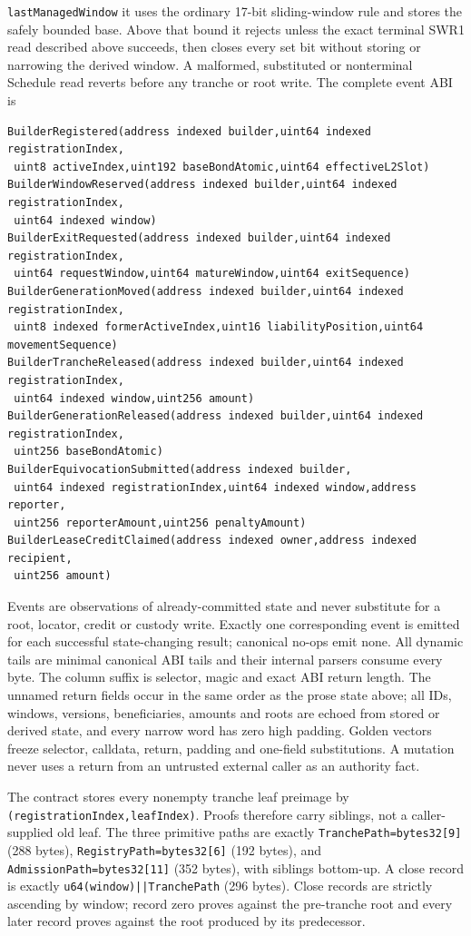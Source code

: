 \documentclass[a4paper,11pt]{article}
\newcommand{\code}[1]{\nolinkurl{#1}}
\begin{document}
\code{lastManagedWindow} it uses the ordinary 17-bit sliding-window rule and
stores the safely bounded base.  Above that bound it rejects unless the exact
terminal SWR1 read described above succeeds, then closes every set bit without
storing or narrowing the derived window.  A malformed, substituted or
nonterminal Schedule read reverts before any tranche or root write.
The complete event ABI is
\begin{verbatim}
BuilderRegistered(address indexed builder,uint64 indexed registrationIndex,
 uint8 activeIndex,uint192 baseBondAtomic,uint64 effectiveL2Slot)
BuilderWindowReserved(address indexed builder,uint64 indexed registrationIndex,
 uint64 indexed window)
BuilderExitRequested(address indexed builder,uint64 indexed registrationIndex,
 uint64 requestWindow,uint64 matureWindow,uint64 exitSequence)
BuilderGenerationMoved(address indexed builder,uint64 indexed registrationIndex,
 uint8 indexed formerActiveIndex,uint16 liabilityPosition,uint64 movementSequence)
BuilderTrancheReleased(address indexed builder,uint64 indexed registrationIndex,
 uint64 indexed window,uint256 amount)
BuilderGenerationReleased(address indexed builder,uint64 indexed registrationIndex,
 uint256 baseBondAtomic)
BuilderEquivocationSubmitted(address indexed builder,
 uint64 indexed registrationIndex,uint64 indexed window,address reporter,
 uint256 reporterAmount,uint256 penaltyAmount)
BuilderLeaseCreditClaimed(address indexed owner,address indexed recipient,
 uint256 amount)
\end{verbatim}
Events are observations of already-committed state and never substitute for a
root, locator, credit or custody write.  Exactly one corresponding event is
emitted for each successful state-changing result; canonical no-ops emit none.
All dynamic tails are minimal canonical ABI tails and their internal parsers
consume every byte.  The column suffix is selector, magic and exact ABI return
length.  The unnamed return fields occur in the same order as the prose state
above; all IDs, windows, versions, beneficiaries, amounts and roots are echoed
from stored or derived state, and every narrow word has zero high padding.
Golden vectors freeze selector, calldata, return, padding and one-field
substitutions.  A mutation never uses a return from an untrusted external
caller as an authority fact.

The contract stores every nonempty tranche leaf preimage by
\code{(registrationIndex,leafIndex)}.  Proofs therefore carry siblings, not a
caller-supplied old leaf.  The three primitive paths are exactly
\code{TranchePath=bytes32[9]} (288 bytes),
\code{RegistryPath=bytes32[6]} (192 bytes), and
\code{AdmissionPath=bytes32[11]} (352 bytes), with siblings bottom-up.  A close
record is exactly \code{u64(window)||TranchePath} (296 bytes).  Close records
are strictly ascending by window; record zero proves against the pre-tranche
root and every later record proves against the root produced by its
predecessor.
\end{document}

